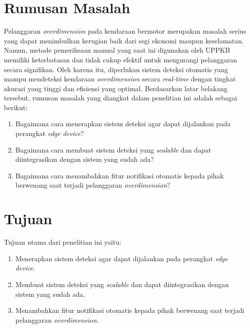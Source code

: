 \section{Rumusan Masalah}
\label{sec:rumusanmasalah}

Pelanggaran \emph{overdimension} pada kendaraan bermotor merupakan masalah serius yang dapat menimbulkan kerugian baik dari segi ekonomi maupun keselamatan. Namun, metode pemeriksaan manual yang saat ini digunakan oleh UPPKB memiliki keterbatasan dan tidak cukup efektif untuk mengurangi pelanggaran secara signifikan. Oleh karena itu, diperlukan sistem deteksi otomatis yang mampu mendeteksi kendaraan \emph{overdimension} secara \emph{real-time} dengan tingkat akurasi yang tinggi dan efisiensi yang optimal. Berdasarkan latar belakang tersebut, rumusan masalah yang diangkat dalam penelitian ini adalah sebagai berikut:

\begin{enumerate}[nolistsep]

  \item Bagaimana cara menerapkan sistem deteksi agar dapat dijalankan pada perangkat \emph{edge device}?
  
  \item Bagaimana cara membuat sistem deteksi yang \emph{scalable} dan dapat diintegrasikan dengan sistem yang sudah ada?
  
  \item Bagaimana cara menambahkan fitur notifikasi otomatis kepada pihak berwenang saat terjadi pelanggaran \emph{overdimension}?
  
\end{enumerate}

\section{Tujuan}
\label{sec:Tujuan}

Tujuan utama dari penelitian ini yaitu:

\begin{enumerate}[nolistsep]

  \item Menerapkan sistem deteksi agar dapat dijalankan pada perangkat \emph{edge device}.
  
  \item Membuat sistem deteksi yang \emph{scalable} dan dapat diintegrasikan dengan sistem yang sudah ada.
  
  \item Menambahkan fitur notifikasi otomatis kepada pihak berwenang saat terjadi pelanggaran \emph{overdimension}.
  
\end{enumerate}

